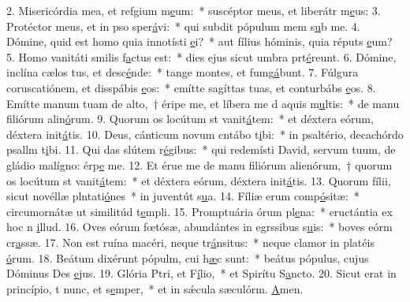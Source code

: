 2. Misericórdia mea, et refgium m\uline{e}um:~* suscéptor meus, et liberátr m\uline{e}us:
3. Protéctor meus, et in pso sper\uline{á}vi:~* qui subdit pópulum mem s\uline{u}b me.
4. Dómine, quid est homo quia innotísti \uline{e}i?~* aut fílius hóminis, quia réputs \uline{e}um?
5. Homo vanitáti smilis f\uline{a}ctus est:~* dies ejus sicut umbra prt\uline{é}reunt.
6. Dómine, inclína cælos tus, et desc\uline{é}nde:~* tange montes, et fumg\uline{á}bunt.
7. Fúlgura coruscatiónem, et disspábis \uline{e}os:~* emítte sagíttas tuas, et conturbábs \uline{e}os.
8. Emítte manum tuam de alto,~† éripe me, et líbera me d aquis m\uline{u}ltis:~* de manu filiórum alin\uline{ó}rum.
9. Quorum os locútum st vanit\uline{á}tem:~* et déxtera eórum, déxtera init\uline{á}tis.
10. Deus, cánticum novum cntábo t\uline{i}bi:~* in psaltério, decachórdo psallm t\uline{i}bi.
11. Qui das slútem r\uline{é}gibus:~* qui redemísti David, servum tuum, de gládio malígno: érp\uline{e} me.
12. Et érue me de manu filiórum alienórum,~† quorum os locútum st vanit\uline{á}tem:~* et déxtera eórum, déxtera init\uline{á}tis.
13. Quorum fílii, sicut novéllæ plntati\uline{ó}nes~* in juventút s\uline{u}a.
14. Fíliæ erum comp\uline{ó}sitæ:~* circumornátæ ut similitúd t\uline{e}mpli.
15. Promptuária órum pl\uline{e}na:~* eructántia ex hoc n \uline{i}llud.
16. Oves eórum fœtósæ, abundántes in egrssibus s\uline{u}is:~* boves eórm cr\uline{a}ssæ.
17. Non est ruína macéri, neque tr\uline{á}nsitus:~* neque clamor in platéis \uline{ó}rum.
18. Beátum dixérunt pópulm, cui h\uline{æ}c sunt:~* beátus pópulus, cujus Dóminus Des \uline{e}jus.
19. Glória Ptri, et F\uline{í}lio,~* et Spirítu S\uline{a}ncto.
20. Sicut erat in princípio, t nunc, et s\uline{e}mper,~* et in sǽcula sæculórm. \uline{A}men.
